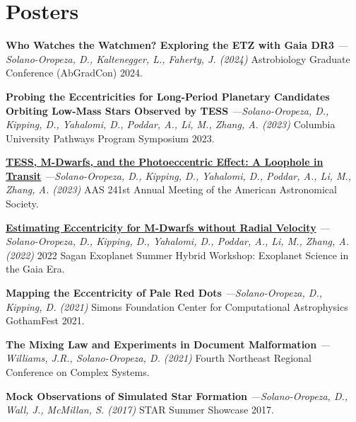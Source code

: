 \documentclass[a4paper,11pt]{article}
\begin{document}
\section{Posters}

    \textbf{Who Watches the Watchmen? Exploring the ETZ with Gaia DR3} \textit{—Solano-Oropeza, D., Kaltenegger, L., Faherty, J. (2024)} Astrobiology Graduate Conference (AbGradCon) 2024.
    \vspace{1.5mm}

    \textbf{Probing the Eccentricities  for Long-Period Planetary Candidates Orbiting Low-Mass Stars Observed by TESS} \textit{—Solano-Oropeza, D., Kipping, D., Yahalomi, D., Poddar, A., Li, M., Zhang, A. (2023)} Columbia University Pathways Program Symposium 2023.
    \vspace{1.5mm}
    
    {\href{https://aas241-aas.ipostersessions.com/default.aspx?s=69-03-D2-AA-C9-A5-80-09-09-82-5E-BB-68-E9-8B-24&guestview=true}{\textbf{TESS, M-Dwarfs, and the Photoeccentric Effect: A Loophole in Transit}}} \textit{—Solano-Oropeza, D., Kipping, D., Yahalomi, D., Poddar, A., Li, M., Zhang, A. (2023)}  AAS 241st Annual Meeting of the American Astronomical Society.
    \vspace{1.5mm}
    
    {\href{https://nexsci.caltech.edu/workshop/2022/posters/finalmaybe_sagan22_eccentricity_poster.pdf}{\textbf{Estimating Eccentricity for M-Dwarfs without Radial Velocity}}} \textit{—Solano-Oropeza, D., Kipping, D., Yahalomi, D., Poddar, A., Li, M., Zhang, A. (2022)} 2022 Sagan Exoplanet Summer Hybrid Workshop: Exoplanet Science in the Gaia Era.
    \vspace{1.5mm}
    
    \textbf{Mapping the Eccentricity of Pale Red Dots} \textit{—Solano-Oropeza, D., Kipping, D. (2021)} Simons Foundation Center for Computational Astrophysics GothamFest 2021.
    \vspace{1.5mm}
    
    \textbf{The Mixing Law and Experiments in Document Malformation} \textit{—Williams, J.R., Solano-Oropeza, D. (2021)} Fourth Northeast Regional Conference on Complex Systems.
    \vspace{1.5mm}
    
    \textbf{Mock Observations of Simulated Star Formation} \textit{—Solano-Oropeza, D., Wall, J., McMillan, S. (2017)} STAR Summer Showcase 2017.
    \vspace{1.5mm}
    
\end{document}
